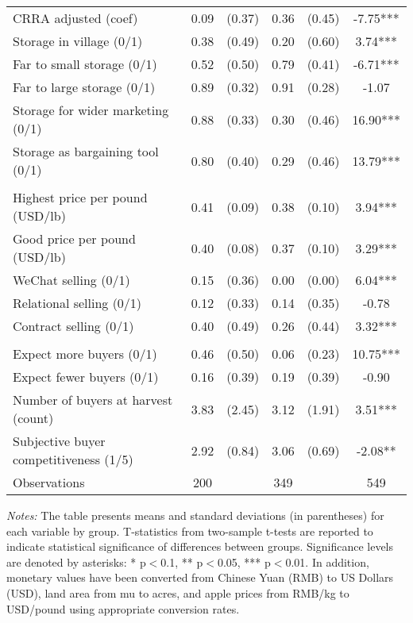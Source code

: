 \begin{table}[H]
{\begin{tabular}{lccccc}
CRRA adjusted (coef) & 0.09 & (0.37) & 0.36 & (0.45) & -7.75*** \\
Storage in village (0/1) & 0.38 & (0.49) & 0.20 & (0.60) & 3.74*** \\
Far to small storage (0/1) & 0.52 & (0.50) & 0.79 & (0.41) & -6.71*** \\
Far to large storage (0/1) & 0.89 & (0.32) & 0.91 & (0.28) & -1.07 \\
Storage for wider marketing (0/1) & 0.88 & (0.33) & 0.30 & (0.46) & 16.90*** \\
Storage as bargaining tool (0/1) & 0.80 & (0.40) & 0.29 & (0.46) & 13.79*** \\
\addlinespace
\multicolumn{6}{l}{\textbf{Panel D: Marketing}} \\
Highest price per pound (USD/lb) & 0.41 & (0.09) & 0.38 & (0.10) & 3.94*** \\
Good price per pound (USD/lb) & 0.40 & (0.08) & 0.37 & (0.10) & 3.29*** \\
WeChat selling (0/1) & 0.15 & (0.36) & 0.00 & (0.00) & 6.04*** \\
Relational selling (0/1) & 0.12 & (0.33) & 0.14 & (0.35) & -0.78 \\
Contract selling (0/1) & 0.40 & (0.49) & 0.26 & (0.44) & 3.32*** \\
\addlinespace
\multicolumn{6}{l}{\textbf{Panel E: Market Competitive Conditions}} \\
Expect more buyers (0/1) & 0.46 & (0.50) & 0.06 & (0.23) & 10.75*** \\
Expect fewer buyers (0/1) & 0.16 & (0.39) & 0.19 & (0.39) & -0.90 \\
Number of buyers at harvest (count) & 3.83 & (2.45) & 3.12 & (1.91) & 3.51*** \\
Subjective buyer competitiveness (1/5) & 2.92 & (0.84) & 3.06 & (0.69) & -2.08** \\
\hline
\hline
Observations & 200 & & 349 & & 549 \\
\bottomrule
\end{tabular}%
} %
\begin{tablenotes} 
\item \textit{Notes:} The table presents means and standard deviations (in parentheses) for each variable by group. T-statistics from two-sample t-tests are reported to indicate statistical significance of differences between groups. Significance levels are denoted by asterisks: * p$<$0.1, ** p$<$0.05, *** p$<$0.01. In addition, monetary values have been converted from Chinese Yuan (RMB) to US Dollars (USD), land area from mu to acres, and apple prices from RMB/kg to USD/pound using appropriate conversion rates. 
\end{tablenotes} 
\end{table}
